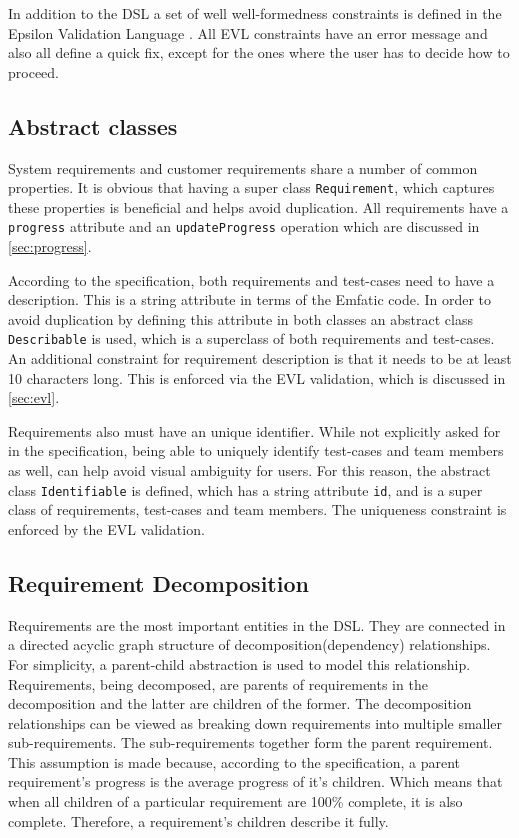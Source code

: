 \documentclass[11pt,a4paper]{article}
\begin{document}
	In addition to the DSL a set of well well-formedness constraints is defined in the Epsilon Validation Language \cite{kolovos2010}. All EVL constraints have an error message and also all define a quick fix, except for the ones where the user has to decide how to proceed. 
	
	\subsection{Abstract classes} \label{sec:abstract}
	System requirements and customer requirements share a number of common properties. It is obvious that having a super class \texttt{Requirement}, which captures these properties is beneficial and helps avoid duplication. All requirements have a \texttt{progress} attribute and an \texttt{updateProgress} operation which are discussed in \autoref{sec:progress}.
	
	According to the specification, both requirements and test-cases need to have a description. This is a string attribute in terms of the Emfatic code. In order to avoid duplication by defining this attribute in both classes an abstract class \texttt{Describable} is used, which is a superclass of both requirements and test-cases. An additional constraint for requirement description is that it needs to be at least 10 characters long. This is enforced via the EVL\cite{kolovos2010} validation, which is discussed in \autoref{sec:evl}.
	
	Requirements also must have an unique identifier. While not explicitly asked for in the specification, being able to uniquely identify test-cases and team members as well, can help avoid visual ambiguity for users. For this reason, the abstract class \texttt{Identifiable} is defined, which has a string attribute \texttt{id}, and is a super class of requirements, test-cases and team members. The uniqueness constraint is enforced by the EVL validation.
	
	\subsection{Requirement Decomposition}
	Requirements are the most important entities in the DSL. They are connected in a directed acyclic graph structure of decomposition(dependency) relationships. For simplicity, a parent-child abstraction is used to model this relationship. Requirements, being decomposed, are parents of requirements in the decomposition and the latter are children of the former. The decomposition relationships can be viewed as breaking down requirements into multiple smaller sub-requirements. The sub-requirements together form the parent requirement. This assumption is made because, according to the specification, a parent requirement's progress is the average progress of it's children. Which means that when all children of a particular requirement are 100\% complete, it is also complete. Therefore, a requirement's children describe it fully. 
	
\end{document}
